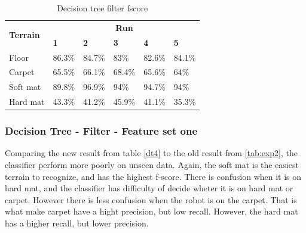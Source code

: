 \documentclass[USenglish]{ifimaster}  %
\begin{document}
	\begin{table}[h]
		\centering
		\begin{tabular}{@{}llllll@{}}
			\toprule
			\multirow{2}{*}{\textbf{Terrain}} & \multicolumn{5}{c}{\textbf{Run}} \\ \cmidrule(l){2-6} 
			& \multicolumn{1}{l|}{\textbf{1}} & \multicolumn{1}{l|}{\textbf{2}} & \multicolumn{1}{l|}{\textbf{3}} & \multicolumn{1}{l|}{\textbf{4}} & \textbf{5} \\ \midrule
			\multicolumn{1}{l|}{Floor} & \multicolumn{1}{l|}{86.3\%} & \multicolumn{1}{l|}{84.7\%} & \multicolumn{1}{l|}{83\%} & \multicolumn{1}{l|}{82.6\%} & 84.1\% \\ \midrule
			\multicolumn{1}{l|}{Carpet} & \multicolumn{1}{l|}{65.5\%} & \multicolumn{1}{l|}{66.1\%} & \multicolumn{1}{l|}{68.4\%} & \multicolumn{1}{l|}{65.6\%} & 64\% \\ \midrule
			\multicolumn{1}{l|}{Soft mat} & \multicolumn{1}{l|}{89.8\%} & \multicolumn{1}{l|}{96.9\%} & \multicolumn{1}{l|}{94\%} & \multicolumn{1}{l|}{94.7\%} & 94\% \\ \midrule
			\multicolumn{1}{l|}{Hard mat} & \multicolumn{1}{l|}{43.3\%} & \multicolumn{1}{l|}{41.2\%} & \multicolumn{1}{l|}{45.9\%} & \multicolumn{1}{l|}{41.1\%} & 35.3\% \\ \bottomrule
		\end{tabular}
		\caption{Decision tree filter fscore}
		\label{dtfilterfscore}
	\end{table}
	\FloatBarrier
	\subsubsection{Decision Tree - Filter - Feature set one}
	Comparing the new result from table \ref{dt4} to the old result from \ref{tab:exp2}, the classifier perform more poorly on unseen data. Again, the soft mat is the easiest terrain to recognize, and has the highest f-score. There is confusion when it is on hard mat, and the classifier has difficulty of decide wheter it is on hard mat or carpet. However there is less confusion when the robot is on the carpet.  That is what make carpet have a hight precision, but low recall. However, the hard mat has a higher recall, but lower precision.  
	
	
	
\end{document}
